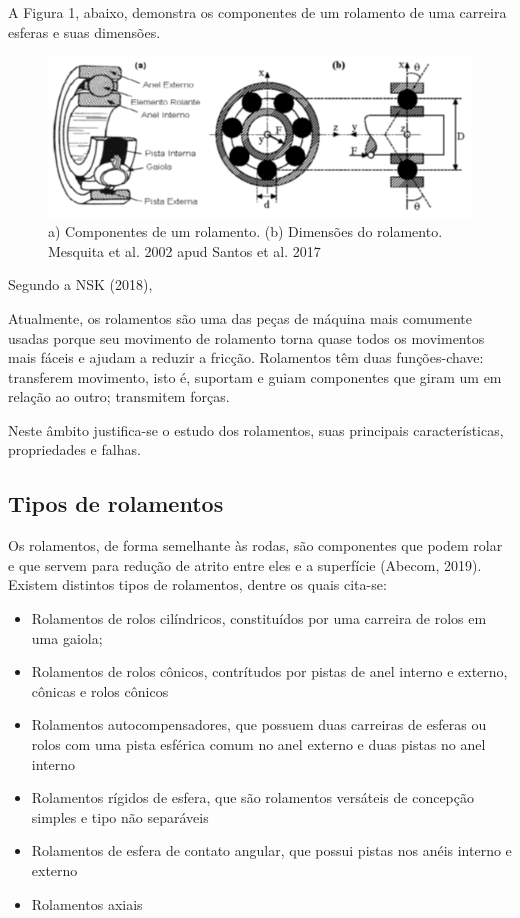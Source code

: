 \documentclass[
	12pt,				
	oneside,			
	a4paper,			
	english,			
	brazil				
	]{abntex2ppgsi}
\begin{document}
A Figura 1, abaixo, demonstra os componentes de um rolamento de uma carreira esferas e suas dimensões. 

\begin{figure}[!htb]
\centering
\includegraphics{Figura1}
\caption{a) Componentes de um rolamento. (b) Dimensões do rolamento. Mesquita et al. 2002 apud Santos et al. 2017}
\label{Figura1}
\end{figure}

Segundo a NSK (2018), 

\begin{citacao}
Atualmente, os rolamentos são uma das peças de máquina mais comumente usadas porque seu movimento de rolamento torna quase todos os movimentos mais fáceis e ajudam a reduzir a fricção. Rolamentos têm duas funções-chave: transferem movimento, isto é, suportam e guiam componentes que giram um em relação ao outro; transmitem forças.
\end{citacao}

Neste âmbito justifica-se o estudo dos rolamentos, suas principais características, propriedades e falhas.

\subsection{\textbf{Tipos de rolamentos}}

Os rolamentos, de forma semelhante às rodas, são componentes que podem rolar  e que servem para redução de atrito entre eles e a superfície (Abecom, 2019). Existem distintos tipos de rolamentos, dentre os quais cita-se:

\begin{itemize}
	\item Rolamentos de rolos cilíndricos, constituídos por uma carreira de rolos em uma gaiola; 
	\item Rolamentos de rolos cônicos, contrítudos por pistas de anel interno e externo, cônicas e rolos cônicos
	\item Rolamentos autocompensadores, que possuem duas carreiras de esferas ou rolos com uma pista esférica comum no anel externo e duas pistas no anel interno 
	\item Rolamentos rígidos de esfera, que são rolamentos versáteis de concepção simples e tipo não separáveis
	\item Rolamentos de esfera de contato angular, que possui pistas nos anéis interno e externo
	\item Rolamentos axiais
\end{itemize}
\end{document}
